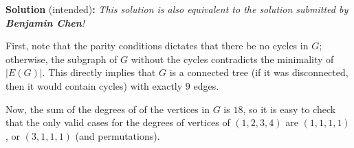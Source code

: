 
\begin{solution}
\textbf{Solution} (intended)\textbf{:}
\newline
\textit{This solution is also equivalent to the solution submitted by \textbf{Benjamin Chen}!}\V

First, note that the parity conditions dictates that there be no cycles in $G$; otherwise, the subgraph of $G$ without the cycles contradicts the minimality of $|E(G)|$. This directly implies that $G$ is a connected tree (if it was disconnected, then it would contain cycles) with exactly $9$ edges. \V

Now, the sum of the degrees of of the vertices in $G$ is $18$, so it is easy to check that the only valid cases for the degrees of vertices of $(1,2,3,4)$ are $(1,1,1,1)$, or $(3,1,1,1)$ (and permutations).\V


\end{solution}
